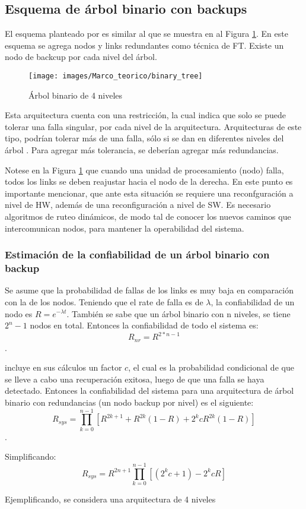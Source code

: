 \subsection{Esquema de árbol binario con backups}
El esquema planteado por \cite{Raghavendra84} es similar al que se muestra en al Figura 
\ref{fig:binary_tree}. En este esquema se agrega nodos y links redundantes como técnica de \ac{FT}. 
Existe un nodo de backcup por cada nivel del árbol.

\begin{figure}[h]
 \centering
 \texttt{[image: images/Marco\_teorico/binary\_tree]}
  \caption{Árbol binario de 4 niveles}  
\label{fig:binary_tree} 
\end{figure}

Esta arquitectura cuenta con una restricción, la cual indica que solo se puede tolerar una 
falla singular, por cada nivel de la arquitectura. Arquitecturas de este tipo, podrían tolerar más 
de una falla, sólo si se dan en diferentes niveles del árbol \citep{Raghavendra84}. Para agregar 
más tolerancia, se deberían agregar más redundancias.

Notese en la Figura \ref{fig:binary_tree} que cuando una unidad de procesamiento (nodo) falla, 
todos los links se deben reajustar hacia el nodo de la derecha. En este punto es importante 
mencionar, que ante esta situación se requiere una reconfguración a nivel de \ac{HW}, además de una 
reconfiguración a nivel de \ac{SW}. Es necesario algoritmos de ruteo dinámicos, de modo tal de 
conocer los nuevos caminos que intercomunican nodos, para mantener la operabilidad del sistema.  

\subsubsection{Estimación de la confiabilidad de un árbol binario con backup}
Se asume que la probabilidad de fallas de los links es muy baja en comparación con la de los nodos. 
Teniendo que el rate de falla es de $\lambda$, la confiabilidad  de un nodo es $R = e^{-\lambda 
t}$. También se sabe que un árbol binario con n niveles, se tiene $2^n - 1$ nodos en total. 
Entonces la confiabilidad de todo el sistema es: $$R_{nr} = R^{2*n - 1}$$.

\cite{Raghavendra84} incluye en sus cálculos un factor $c$, el cual es la probabilidad condicional 
de que se lleve a cabo una recuperación exitosa, luego de que una falla se haya detectado. Entonces 
la confiabilidad del sistema para una arquitectura de árbol binario con redundancias (un nodo 
backup por nivel) es el siguiente: $$R_{sys} = \prod_{k=0}^{n-1}{[R^{2k +1} + R^{2k}(1-R) + 
2^kcR^{2k}(1-R)]}$$.

Simplificando: $$R_{sys} = R^{2n +1} \prod_{k=0}^{n-1}{[(2^kc+1) - 2^kcR]}$$

Ejemplificando, se considera una arquitectura de 4 niveles